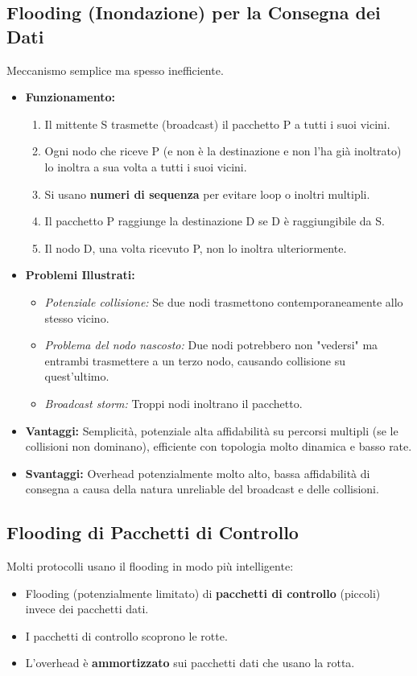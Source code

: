 \documentclass{article}
\begin{document}
\subsection{Flooding (Inondazione) per la Consegna dei Dati}
Meccanismo semplice ma spesso inefficiente.
\begin{itemize}
    \item \textbf{Funzionamento:}
    \begin{enumerate}
        \item Il mittente S trasmette (broadcast) il pacchetto P a tutti i suoi vicini.
        \item Ogni nodo che riceve P (e non è la destinazione e non l'ha già inoltrato) lo inoltra a sua volta a tutti i suoi vicini.
        \item Si usano \textbf{numeri di sequenza} per evitare loop o inoltri multipli.
        \item Il pacchetto P raggiunge la destinazione D se D è raggiungibile da S.
        \item Il nodo D, una volta ricevuto P, non lo inoltra ulteriormente.
    \end{enumerate}
    \item \textbf{Problemi Illustrati:}
    \begin{itemize}
        \item \textit{Potenziale collisione:} Se due nodi trasmettono contemporaneamente allo stesso vicino.
        \item \textit{Problema del nodo nascosto:} Due nodi potrebbero non "vedersi" ma entrambi trasmettere a un terzo nodo, causando collisione su quest'ultimo.
        \item \textit{Broadcast storm:} Troppi nodi inoltrano il pacchetto.
    \end{itemize}
    \item \textbf{Vantaggi:} Semplicità, potenziale alta affidabilità su percorsi multipli (se le collisioni non dominano), efficiente con topologia molto dinamica e basso rate.
    \item \textbf{Svantaggi:} Overhead potenzialmente molto alto, bassa affidabilità di consegna a causa della natura unreliable del broadcast e delle collisioni.
\end{itemize}

\subsection{Flooding di Pacchetti di Controllo}
Molti protocolli usano il flooding in modo più intelligente:
\begin{itemize}
    \item Flooding (potenzialmente limitato) di \textbf{pacchetti di controllo} (piccoli) invece dei pacchetti dati.
    \item I pacchetti di controllo scoprono le rotte.
    \item L'overhead è \textbf{ammortizzato} sui pacchetti dati che usano la rotta.
\end{itemize}
\end{document}
